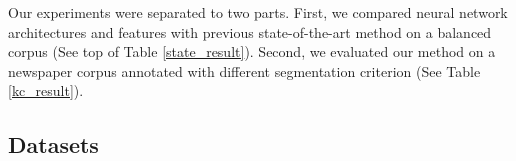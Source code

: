 \documentclass[11pt,letterpaper]{article}
\begin{document}
Our experiments were separated to two parts. First, we compared neural network architectures and features with previous state-of-the-art method on a balanced corpus (See top of Table \ref{state_result}). 
Second, we evaluated our method on a newspaper corpus annotated with different segmentation criterion (See Table \ref{kc_result}). 
\subsection{Datasets}
\begin{table}[t]
                                                                                                                                                                                                                                                                                             

\end{table}
\end{document}
